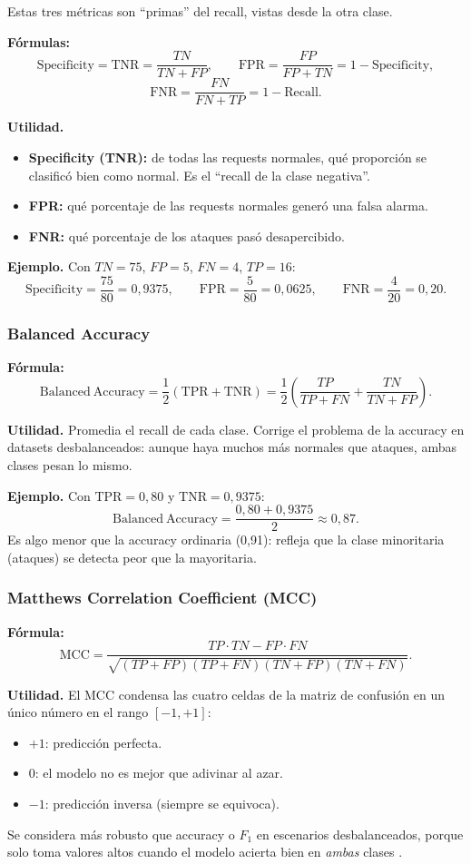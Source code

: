 \documentclass[12pt,oneside]{report}
\begin{document}
Estas tres métricas son ``primas'' del recall, vistas desde la otra clase.

\textbf{Fórmulas:}
\[
\mathrm{Specificity}=\mathrm{TNR}=\frac{TN}{TN+FP},\qquad
\mathrm{FPR}=\frac{FP}{FP+TN}=1-\mathrm{Specificity},
\]
\[
\mathrm{FNR}=\frac{FN}{FN+TP}=1-\mathrm{Recall}.
\]

\textbf{Utilidad.}
\begin{itemize}[leftmargin=*]
  \item \textbf{Specificity (TNR):} de todas las requests normales, qué
  proporción se clasificó bien como normal. Es el ``recall de la clase
  negativa''.
  \item \textbf{FPR:} qué porcentaje de las requests normales generó una
  falsa alarma.
  \item \textbf{FNR:} qué porcentaje de los ataques pasó desapercibido.
\end{itemize}

\textbf{Ejemplo.} Con $TN=75$, $FP=5$, $FN=4$, $TP=16$:
\[
\mathrm{Specificity}=\frac{75}{80}=0{,}9375,\qquad
\mathrm{FPR}=\frac{5}{80}=0{,}0625,\qquad
\mathrm{FNR}=\frac{4}{20}=0{,}20.
\]

\subsubsection{Balanced Accuracy}

\textbf{Fórmula:}
\[
\mathrm{Balanced\ Accuracy}=\frac{1}{2}\left(\mathrm{TPR}+\mathrm{TNR}\right)
=\frac{1}{2}\left(\frac{TP}{TP+FN}+\frac{TN}{TN+FP}\right).
\]

\textbf{Utilidad.} Promedia el recall de cada clase. Corrige el problema
de la accuracy en datasets desbalanceados: aunque haya muchos más
normales que ataques, ambas clases pesan lo mismo.

\textbf{Ejemplo.} Con $\mathrm{TPR}=0{,}80$ y $\mathrm{TNR}=0{,}9375$:
\[
\mathrm{Balanced\ Accuracy}=\frac{0{,}80+0{,}9375}{2}\approx 0{,}87.
\]
Es algo menor que la accuracy ordinaria (0{,}91): refleja que la clase
minoritaria (ataques) se detecta peor que la mayoritaria.

\subsubsection{Matthews Correlation Coefficient (MCC)}

\textbf{Fórmula:}
\[
\mathrm{MCC}=\frac{TP\cdot TN - FP\cdot FN}{\sqrt{(TP+FP)(TP+FN)(TN+FP)(TN+FN)}}.
\]

\textbf{Utilidad.} El MCC condensa las cuatro celdas de la matriz de
confusión en un único número en el rango $[-1,+1]$:
\begin{itemize}[leftmargin=*]
  \item $+1$: predicción perfecta.
  \item $0$: el modelo no es mejor que adivinar al azar.
  \item $-1$: predicción inversa (siempre se equivoca).
\end{itemize}
Se considera más robusto que accuracy o $F_1$ en escenarios
desbalanceados, porque solo toma valores altos cuando el modelo acierta
bien en \emph{ambas} clases \cite{chicco_mcc}.
\end{document}
